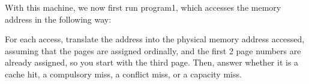 \begin{blocksection}
\question 
With this machine, we now first run program1, which accesses the memory address in the following way:

For each access, translate the address into the physical memory address accessed, assuming that the pages are assigned ordinally, and the first 2 page numbers are already assigned, so you start with the third page. Then, answer whether it is a cache hit, a compulsory miss, a conflict miss, or a capacity miss.


\end{blocksection}